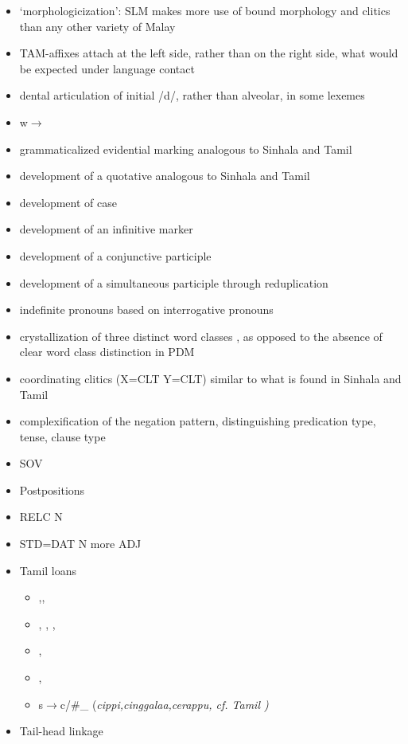 \documentclass[a4paper,12pt]{article}
\begin{document}
\begin{itemize}
 \item `morphologicization': SLM makes more use of bound morphology and clitics than any other variety of Malay
 \item TAM-affixes attach at the left side, rather than on the right side, what would be expected under language contact \citep{Nordhoff2006cll}
 \item dental articulation of initial /d/, rather than alveolar, in some lexemes \citep{Smith2003timing}
 \item w$\to$\V \citep{Bichsel,Smith2003timing}
 \item grammaticalized evidential marking analogous to Sinhala and Tamil \citep{SmithEtAl2006cll,Nordhoff2009phd}
 \item development of a quotative analogous to Sinhala and Tamil \citep{Nordhoff2009phd}
 \item development of case 
 \item development of an infinitive marker \citep{Nordhoff2009phd}
 \item development of a conjunctive participle \citep{Nordhoff2009phd}
 \item development of a simultaneous participle through reduplication \citep{Nordhoff2009phd}
 \item indefinite pronouns based on interrogative pronouns \citep{Nordhoff2009phd}
 \item crystallization of three distinct word classes \citep{Nordhofffcjoat}, as opposed to the absence of clear word class distinction in PDM \citep{Paauw2004}
 \item coordinating clitics (X=CLT Y=CLT) similar to what is found in Sinhala and Tamil
 \item complexification of the negation pattern, distinguishing predication type, tense, clause type \citep{Slomanson2008lingua,Nordhoff2009phd} \citep{Slomanson2008lingua,Nordhoff2009phd}
 \item SOV
 \item Postpositions
 \item RELC N
 \item STD=DAT N more ADJ 
 \item Tamil loans
 \begin{itemize}
  \item {} ,, 
  \item {}, , ,
  \item {},
  \item {}, 
  \item s$\to$c/\#\_ (\em cippi,cinggalaa,cerappu\em, cf. Tamil )\kuckn
 \end{itemize}
 \item Tail-head linkage \citep{Nordhoff2009phd}
\end{itemize}                  
 
\end{document}
